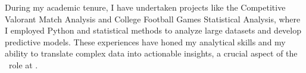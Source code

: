 
During my academic tenure, I have undertaken projects like the Competitive Valorant Match Analysis and College Football Games Statistical Analysis, where I employed Python and statistical methods to analyze large datasets and develop predictive models. These experiences have honed my analytical skills and my ability to translate complex data into actionable insights, a crucial aspect of the \position\ role at \company.
